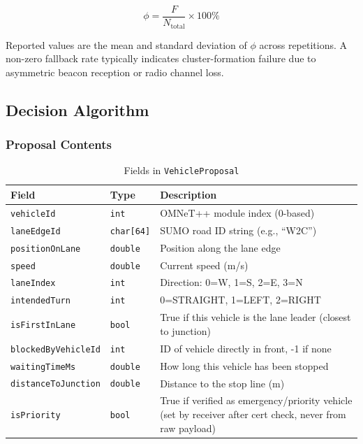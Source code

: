 \documentclass[fleqn,10pt]{olplainarticle}
\begin{document}
\[
  \phi = \frac{F}{N_{\mathrm{total}}} \times 100\% 
\]

Reported values are the mean and standard deviation of $\phi$ across repetitions.
A non-zero fallback rate typically indicates cluster-formation failure due to
asymmetric beacon reception or radio channel loss.


\subsection{Decision Algorithm}

\subsubsection{Proposal Contents}
\begin{table}[H]
\centering
\caption{Fields in \texttt{VehicleProposal}}
\label{tab:vehicle-proposal}
\begin{tabular}{|l|l|p{8cm}|}
\hline
\textbf{Field} & \textbf{Type} & \textbf{Description} \\
\hline
\texttt{vehicleId} & \texttt{int} & OMNeT++ module index (0-based) \\
\hline
\texttt{laneEdgeId} & \texttt{char[64]} & SUMO road ID string (e.g., ``W2C'') \\
\hline
\texttt{positionOnLane} & \texttt{double} & Position along the lane edge \\
\hline
\texttt{speed} & \texttt{double} & Current speed (m/s) \\
\hline
\texttt{laneIndex} & \texttt{int} & Direction: 0=W, 1=S, 2=E, 3=N \\
\hline
\texttt{intendedTurn} & \texttt{int} & 0=STRAIGHT, 1=LEFT, 2=RIGHT \\
\hline
\texttt{isFirstInLane} & \texttt{bool} & True if this vehicle is the lane leader (closest to junction) \\
\hline
\texttt{blockedByVehicleId} & \texttt{int} & ID of vehicle directly in front, -1 if none \\
\hline
\texttt{waitingTimeMs} & \texttt{double} & How long this vehicle has been stopped \\
\hline
\texttt{distanceToJunction} & \texttt{double} & Distance to the stop line (m) \\
\hline
\texttt{isPriority} & \texttt{bool} & True if verified as emergency/priority vehicle (set by receiver after cert check, never from raw payload) \\
\hline
\end{tabular}
\end{table}
\end{document}
